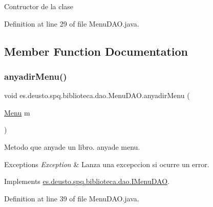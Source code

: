 Contructor de la clase 

Definition at line 29 of file Menu\+D\+A\+O.\+java.



\subsection{Member Function Documentation}
\mbox{\label{classes_1_1deusto_1_1spq_1_1biblioteca_1_1dao_1_1_menu_d_a_o_af7d7568033bc78af220f0fd5cf4a71b6}} 
\subsubsection{\texorpdfstring{anyadir\+Menu()}{anyadirMenu()}}
{\footnotesize\ttfamily void es.\+deusto.\+spq.\+biblioteca.\+dao.\+Menu\+D\+A\+O.\+anyadir\+Menu (\begin{DoxyParamCaption}\item[{\mbox{\hyperlink{classes_1_1deusto_1_1spq_1_1biblioteca_1_1data_1_1_menu}{Menu}}}]{m }\end{DoxyParamCaption})}

Metodo que anyade un libro.  anyade menu. 
\begin{DoxyExceptions}{Exceptions}
{\em Exception} & Lanza una excepccion si ocurre un error. \\
\hline
\end{DoxyExceptions}


Implements \mbox{\hyperlink{interfacees_1_1deusto_1_1spq_1_1biblioteca_1_1dao_1_1_i_menu_d_a_o_a1c99a228f8d92ef41cbd3c4aae426eb0}{es.\+deusto.\+spq.\+biblioteca.\+dao.\+I\+Menu\+D\+AO}}.



Definition at line 39 of file Menu\+D\+A\+O.\+java.

